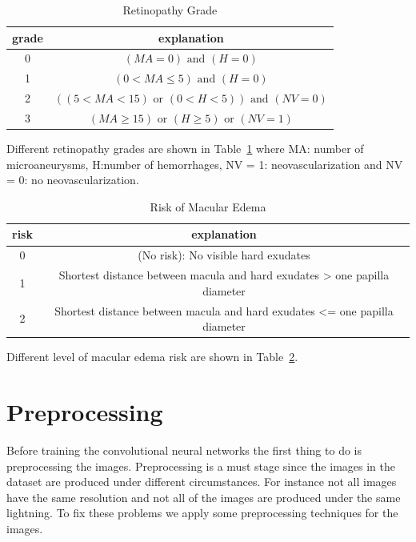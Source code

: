 \begin{table}[t]
\centering
\caption{Retinopathy Grade} \label{tab:rg}
\begin{tabular}{|c|c|} \hline
grade & explanation \\ \hline
0 & $(\textit{MA} = 0) \text{ and } (H = 0)$ \\ \hline
1 & $(0 < \textit{MA} \leq 5) \text{ and } (H = 0)$\\\hline
2 & $((5 < \textit{MA} < 15) \text{ or } (0 < H < 5)) \text{ and } (\textit{NV} = 0)$ \\\hline
3 & $(\textit{MA} \geq 15) \text{ or } (H \geq 5) \text{ or } (\textit{NV} = 1)$\\\hline
\end{tabular}
\end{table}

Different retinopathy grades are shown in Table~\ref{tab:rg} where MA: number of microaneurysms, H:number of hemorrhages, NV = 1: neovascularization and NV = 0: no neovascularization. 

\begin{table}[t]
\centering
\caption{Risk of Macular Edema} \label{tab:ma}
\begin{tabular}{|c|c|} \hline
risk & explanation \\ \hline
0 & (No risk): No visible hard exudates \\ \hline
1 & Shortest distance between macula and hard exudates > one papilla diameter\\\hline
2 & Shortest distance between macula and hard exudates <= one papilla diameter \\\hline
\end{tabular}
\end{table}

Different level of macular edema risk are shown in Table~\ref{tab:ma}.

\section{Preprocessing}
Before training the convolutional neural networks the first thing to do is preprocessing the images. Preprocessing is a must stage since the images in the dataset are produced under different circumstances. For instance not all images have the same resolution and not all of the images are produced under the same lightning. To fix these problems we apply some preprocessing techniques for the images. 

